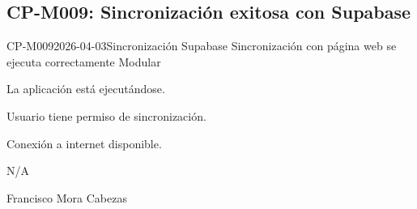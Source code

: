 \subsection{CP-M009: Sincronización exitosa con Supabase}
\def\cpPasos{%
  \item Localizar el botón de sincronización (barra superior).
  \item Presionar el botón de sincronización.
  \item Observar el mensaje resultante.}
\def\cpResultadoE{%
  \item El sistema indica que la sincronización fue exitosa.}
\def\cpResultadoO{El sistema mostró el mensaje: ``la sincronización con la página web
  fue exitosa''. La interrelación entre el sistema local y Supabase funciona correctamente.}
\casoprueba
  {CP-M009}{2026-04-03}{Sincronización \arr{} Supabase}
  {Sincronización con página web se ejecuta correctamente}
  {Modular}{\estadoAprobado}
  {\item La aplicación está ejecutándose.
   \item Usuario tiene permiso de sincronización.
   \item Conexión a internet disponible.}
  {\item N/A}
  {Francisco Mora Cabezas}
